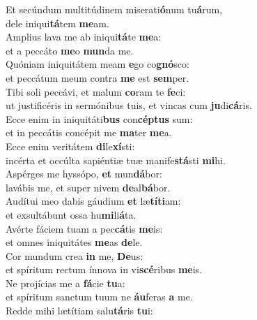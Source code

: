 \evenverse Et secúndum multitúdinem miserati\textbf{ó}num tu\textbf{á}rum,~\*\\
\evenverse dele iniqui\textbf{tá}tem \textbf{me}am.\\
\oddverse Amplius lava me ab iniqui\textbf{tá}te \textbf{me}a:~\*\\
\oddverse et a peccáto \textbf{me}o \textbf{mun}da me.\\
\evenverse Quóniam iniquitátem meam \textbf{e}go co\textbf{gnó}sco:~\*\\
\evenverse et peccátum meum contra \textbf{me} est \textbf{sem}per.\\
\oddverse Tibi soli peccávi, et malum \textbf{co}ram te \textbf{fe}ci:~\*\\
\oddverse ut justificéris in sermónibus tuis, et vincas cum \textbf{ju}di\textbf{cá}ris.\\
\evenverse Ecce enim in iniquitáti\textbf{bus} con\textbf{cép}\textbf{tus} sum:~\*\\
\evenverse et in peccátis concépit me \textbf{ma}ter \textbf{me}a.\\
\oddverse Ecce enim veritátem \textbf{di}le\textbf{xí}sti:~\*\\
\oddverse incérta et occúlta sapiéntiæ tuæ manife\textbf{stá}sti \textbf{mi}hi.\\
\evenverse Aspérges me hyssópo, \textbf{et} mun\textbf{dá}bor:~\*\\
\evenverse lavábis me, et super nivem \textbf{de}al\textbf{bá}bor.\\
\oddverse Audítui meo dabis gáudium \textbf{et} læ\textbf{tí}\textbf{ti}am:~\*\\
\oddverse et exsultábunt ossa hu\textbf{mi}li\textbf{á}ta.\\
\evenverse Avérte fáciem tuam a pec\textbf{cá}tis \textbf{me}is:~\*\\
\evenverse et omnes iniquitátes \textbf{me}as \textbf{de}le.\\
\oddverse Cor mundum crea \textbf{in} me, \textbf{De}us:~\*\\
\oddverse et spíritum rectum ínnova in vi\textbf{scé}ribus \textbf{me}is.\\
\evenverse Ne projícias me a \textbf{fá}cie \textbf{tu}a:~\*\\
\evenverse et spíritum sanctum tuum ne \textbf{áu}feras \textbf{a} me.\\
\oddverse Redde mihi lætítiam salu\textbf{tá}ris \textbf{tu}i:~\*\\
